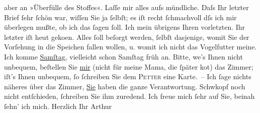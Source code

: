 \begin{ledgroupsized}[t]{13cm}
               aber an »Überfülle des Stoffes«. Laſſe mir alles aufs mündliche. Daſs Ihr letzter
               Brief ſehr ſchön {\pb}war, wiſſen Sie ja ſelbſt; es iſt
               recht ſchmachvoll dſs ich mir überlegen mußte, ob ich das ſagen ſoll. Ich mein
               übrigens Ihren vorletzten. Ihr letzter iſt heut geko{\geminationm}en.\pend
           \pstart
           Alles ſoll beſorgt werden, ſelbſt dasjenige, womit Sie der Vorſehung in die Speichen
               fallen wollen, u. womit ich nicht das Vogel{\pb}futter
               meine.\pend
           \pstart
           Ich komme \uline{Samſtag}, vielleicht schon Samſtag früh an.
               Bitte, we{\geminationn}’s Ihnen nicht unbequem, beſtellen Sie \uline{mir} (nicht für meine Mama, die ſpäter ko{\geminationm}t) das
               Zimmer; iſt’s Ihnen unbequem, ſo ſchreiben Sie dem \textsc{Petter} eine {\pb}Karte. – Ich ſage nichts näheres über das
               Zimmer, \uline{Sie} haben die ganze Verantwortung.\pend
           \pstart
           Schwkopf noch nicht entſchieden, ſchreiben Sie
               ihm zuredend.\pend
           \pstart
           Ich freue mich ſehr auf Sie, beinah ſehn’ ich mich.\pend
           \pstart Herzlich Ihr \spacefill\mbox{Arthur}\pend{}
         
         \endnumbering{}\end{ledgroupsized}  \newcommand{\dateiname}{L00690}\newcommand{\titel}{Arthur Schnitzler an Richard Beer-Hofmann, 23. 6. 1897}\newcommand{\editorInnen}{Martin Anton Müller und Gerd-Hermann Susen}
      